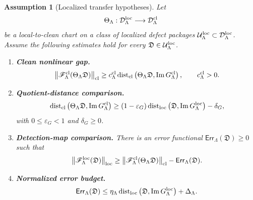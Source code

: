 \documentclass[11pt]{article}
\numberwithin{equation}{section}
\newtheorem{assumption}[theorem]{Assumption}
\newcommand{\eps}{\varepsilon}
\newcommand{\Err}{\mathsf{Err}}
\newcommand{\Image}{\operatorname{Im}}
\newcommand{\Dist}{\operatorname{dist}}
\begin{document}
\begin{assumption}[Localized transfer hypotheses]\label{ass:localized-transfer-hypotheses}
Let
\[
        \Theta_\Lambda:
        \mathcal D_\Lambda^{\rm loc}
        \longrightarrow
        \mathcal D_\Lambda^{\rm cl}
\]
be a local-to-clean chart on a class of localized defect packages
\(\mathcal U_\Lambda^{\rm loc}\subset\mathcal D_\Lambda^{\rm loc}\).
Assume the following estimates hold for every
\(\mathfrak D\in\mathcal U_\Lambda^{\rm loc}\).

\begin{enumerate}[label=(\roman*),leftmargin=2em]
    \item \textbf{Clean nonlinear gap.}
    \[
        \left\|
        \mathscr F_\Lambda^{\rm cl}
        (\Theta_\Lambda\mathfrak D)
        \right\|_{\rm cl}
        \ge
        c_\Lambda^{\rm cl}
        \Dist_{\rm cl}
        \left(
        \Theta_\Lambda\mathfrak D,
        \Image G_\Lambda^{\rm cl}
        \right),
        \qquad c_\Lambda^{\rm cl}>0 .
    \]

    \item \textbf{Quotient-distance comparison.}
    \[
        \Dist_{\rm cl}
        \left(
        \Theta_\Lambda\mathfrak D,
        \Image G_\Lambda^{\rm cl}
        \right)
        \ge
        (1-\eps_G)
        \Dist_{\rm loc}
        \left(
        \mathfrak D,
        \Image G_\Lambda^{\rm loc}
        \right)
        -
        \delta_G ,
    \]
    with \(0\leq\eps_G<1\) and \(\delta_G\ge0\).

    \item \textbf{Detection-map comparison.}
    There is an error functional \(\Err_\Lambda(\mathfrak D)\ge0\) such that
    \[
        \left\|
        \mathscr F_\Lambda^{\rm loc}(\mathfrak D)
        \right\|_{\rm loc}
        \ge
        \left\|
        \mathscr F_\Lambda^{\rm cl}
        (\Theta_\Lambda\mathfrak D)
        \right\|_{\rm cl}
        -
        \Err_\Lambda(\mathfrak D).
    \]

    \item \textbf{Normalized error budget.}
    \[
        \Err_\Lambda(\mathfrak D)
        \le
        \eta_\Lambda
        \Dist_{\rm loc}
        \left(
        \mathfrak D,
        \Image G_\Lambda^{\rm loc}
        \right)
        +
        \Delta_\Lambda .
    \]
\end{enumerate}
\end{assumption}
\end{document}

